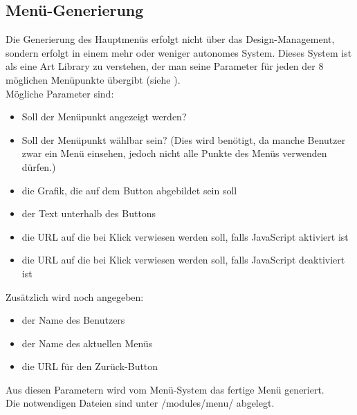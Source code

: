 \subsection{Menü-Generierung}
Die Generierung des Hauptmenüs erfolgt nicht über das Design-Management, sondern erfolgt in einem mehr oder weniger autonomes System. Dieses System ist als eine Art Library zu verstehen, der man seine Parameter für jeden der 8 möglichen Menüpunkte übergibt (siehe ).\\
Mögliche Parameter sind:
\begin{itemize}
	\item Soll der Menüpunkt angezeigt werden?
	\item Soll der Menüpunkt wählbar sein? (Dies wird benötigt, da manche Benutzer zwar ein Menü einsehen, jedoch nicht alle Punkte des Menüs verwenden dürfen.)
	\item die Grafik, die auf dem Button abgebildet sein soll
	\item der Text unterhalb des Buttons
	\item die URL auf die bei Klick verwiesen werden soll, falls JavaScript aktiviert ist
	\item die URL auf die bei Klick verwiesen werden soll, falls JavaScript deaktiviert ist
\end{itemize}
Zusätzlich wird noch angegeben:
\begin{itemize}
	\item der Name des Benutzers
	\item der Name des aktuellen Menüs
	\item die URL für den Zurück-Button
\end{itemize}
Aus diesen Parametern wird vom Menü-System das fertige Menü generiert.\\
Die notwendigen Dateien sind unter /modules/menu/ abgelegt.
